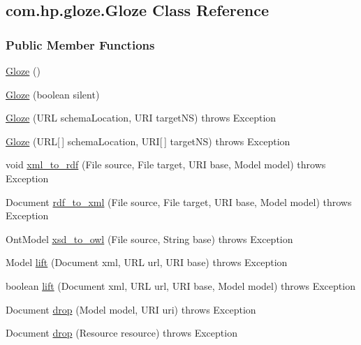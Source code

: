 \hypertarget{classcom_1_1hp_1_1gloze_1_1_gloze}{
\subsection{com.hp.gloze.Gloze Class Reference}
\label{classcom_1_1hp_1_1gloze_1_1_gloze}
}
\subsubsection*{Public Member Functions}
\begin{DoxyCompactItemize}
\item 
\hyperlink{classcom_1_1hp_1_1gloze_1_1_gloze_a1baa43e23eabc27283a8d41041e23b50}{Gloze} ()
\item 
\hyperlink{classcom_1_1hp_1_1gloze_1_1_gloze_a7ad809006ee768f2938aabf10efe9f26}{Gloze} (boolean silent)
\item 
\hyperlink{classcom_1_1hp_1_1gloze_1_1_gloze_ad81afee66006cc4229a75296ce365aa8}{Gloze} (URL schemaLocation, URI targetNS)  throws Exception 
\item 
\hyperlink{classcom_1_1hp_1_1gloze_1_1_gloze_a89bab13ce337f1d674204631e220898e}{Gloze} (URL\mbox{[}$\,$\mbox{]} schemaLocation, URI\mbox{[}$\,$\mbox{]} targetNS)  throws Exception 
\item 
void \hyperlink{classcom_1_1hp_1_1gloze_1_1_gloze_acb73c06c06a33a44cbaa0e846c76fd33}{xml\_\-to\_\-rdf} (File source, File target, URI base, Model model)  throws Exception 
\item 
Document \hyperlink{classcom_1_1hp_1_1gloze_1_1_gloze_afb5f6d01b6ac4f73b37a7c38982b6244}{rdf\_\-to\_\-xml} (File source, File target, URI base, Model model)  throws Exception 
\item 
OntModel \hyperlink{classcom_1_1hp_1_1gloze_1_1_gloze_a9db17584be845f2055b8d8895f0f7f29}{xsd\_\-to\_\-owl} (File source, String base)  throws Exception 
\item 
Model \hyperlink{classcom_1_1hp_1_1gloze_1_1_gloze_a772e519e007a8d678dee15a1f0128e40}{lift} (Document xml, URL url, URI base)  throws Exception 
\item 
boolean \hyperlink{classcom_1_1hp_1_1gloze_1_1_gloze_a18b281e8a93da94ddd22666333cf0f06}{lift} (Document xml, URL url, URI base, Model model)  throws Exception 
\item 
Document \hyperlink{classcom_1_1hp_1_1gloze_1_1_gloze_afadb6872a06d0ae277b0605ea7a45084}{drop} (Model model, URI uri)  throws Exception 
\item 
Document \hyperlink{classcom_1_1hp_1_1gloze_1_1_gloze_a922d878145fee8de5841693ebd3cbf42}{drop} (Resource resource)  throws Exception 
\end{DoxyCompactItemize}
